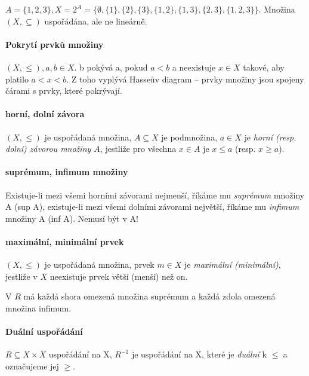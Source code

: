 \documentclass[a4paper, 11pt]{report}
\begin{document}
$A = \{1,2,3\}, X = 2^A = \{\emptyset, \{1\}, \{2\}, \{3\}, \{1, 2\}, \{1, 3\}, \{2, 3\}, \{1, 2, 3\} \}$. Množina $(X, \subseteq)$ uspořádána, ale ne lineárně.

\paragraph{Pokrytí prvků množiny}
$(X, \leq), a,b \in X$. b pokývá a, pokud $a < b$ a neexistuje $x \in X$ takové, aby platilo $a < x < b$. Z toho vyplývá Hasseův diagram -- prvky množiny jsou spojeny čárami s prvky, které pokrývají.

\paragraph{horní, dolní závora}
$(X, \leq)$ je uspořádaná množina, $A \subseteq X$ je podmnožina, $a \in X$ je \emph{horní (resp. dolní) závorou množiny $A$}, jestliže pro všechna $x \in A$ je $x \leq a$ (resp. $x \geq a$).

\paragraph{suprémum, infimum množiny}
Existuje-li mezi všemi horními závorami nejmenší, říkáme mu \emph{suprémum} množiny A (sup A), existuje-li mezi všemi dolními závorami největší, říkáme mu \emph{infimum} množiny A (inf A). Nemusí být v A!

\paragraph{maximální, minimální prvek}
$(X, \leq)$ je uspořádaná množina, prvek $m \in X$ je \emph{maximální (minimální)}, jestliže v $X$ neexistuje prvek větší (menší) než on.

V $R$ má každá shora omezená množina suprémum a každá zdola omezená množina infimum.

\paragraph{Duální uspořádání}
$R \subseteq X \times X$ uspořádání na X, $R^{-1}$ je uspořádání na X, které je \emph{duální} k $\leq$ a označujeme jej $\geq$.
\end{document}
